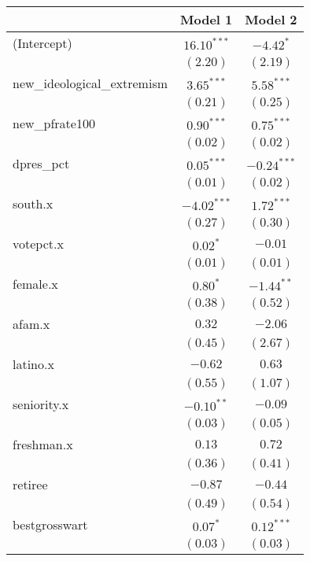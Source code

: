 \documentclass[12pt]{article}
\begin{document}
\begin{table}
	\begin{center}
		\begin{tabular}{l c c }
			\hline
			& Model 1 & Model 2 \\
			\hline
			(Intercept)                 & $16.10^{***}$ & $-4.42^{*}$   \\
			& $(2.20)$      & $(2.19)$      \\
			new\_ideological\_extremism & $3.65^{***}$  & $5.58^{***}$  \\
			& $(0.21)$      & $(0.25)$      \\
			new\_pfrate100              & $0.90^{***}$  & $0.75^{***}$  \\
			& $(0.02)$      & $(0.02)$      \\
			dpres\_pct                  & $0.05^{***}$  & $-0.24^{***}$ \\
			& $(0.01)$      & $(0.02)$      \\
			south.x                     & $-4.02^{***}$ & $1.72^{***}$  \\
			& $(0.27)$      & $(0.30)$      \\
			votepct.x                   & $0.02^{*}$    & $-0.01$       \\
			& $(0.01)$      & $(0.01)$      \\
			female.x                    & $0.80^{*}$    & $-1.44^{**}$  \\
			& $(0.38)$      & $(0.52)$      \\
			afam.x                      & $0.32$        & $-2.06$       \\
			& $(0.45)$      & $(2.67)$      \\
			latino.x                    & $-0.62$       & $0.63$        \\
			& $(0.55)$      & $(1.07)$      \\
			seniority.x                 & $-0.10^{**}$  & $-0.09$       \\
			& $(0.03)$      & $(0.05)$      \\
			freshman.x                  & $0.13$        & $0.72$        \\
			& $(0.36)$      & $(0.41)$      \\
			retiree                     & $-0.87$       & $-0.44$       \\
			& $(0.49)$      & $(0.54)$      \\
			bestgrosswart               & $0.07^{*}$    & $0.12^{***}$  \\
			& $(0.03)$      & $(0.03)$      \\

\end{tabular}
\end{center}
\end{table}
\end{document}
